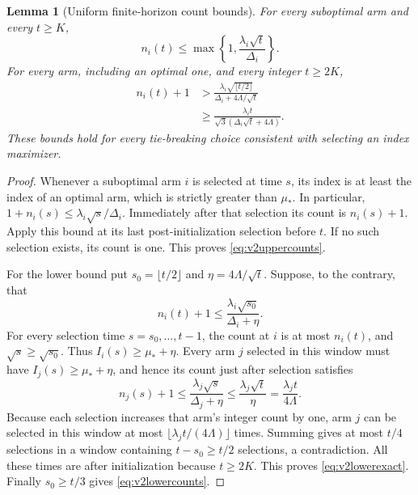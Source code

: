 \documentclass{article}
\theoremstyle{plain}
\newtheorem{lemma}[theorem]{Lemma}
\theoremstyle{definition}
\begin{document}
\begin{lemma}[Uniform finite-horizon count bounds]
\label{lem:v2counts}
For every suboptimal arm and every $t\ge K$,
\begin{equation}
 n_i(t)\le\max\!\left\{1,\frac{\lambda_i\sqrt t}{\Delta_i}\right\}.
 \label{eq:v2uppercounts}
\end{equation}
For every arm, including an optimal one, and every integer $t\ge2K$,
\begin{align}
 n_i(t)+1
 &>\frac{\lambda_i\sqrt{\lfloor t/2\rfloor}}
          {\Delta_i+4\Lambda/\sqrt t}
 \label{eq:v2lowerexact}\\
 &\ge\frac{\lambda_i t}
             {\sqrt3(\Delta_i\sqrt t+4\Lambda)}.
 \label{eq:v2lowercounts}
\end{align}
These bounds hold for every tie-breaking choice consistent with selecting
an index maximizer.
\end{lemma}
\begin{proof}
Whenever a suboptimal arm $i$ is selected at time $s$, its index is at
least the index of an optimal arm, which is strictly greater than
$\mu_*$. In particular,
$1+n_i(s)\le\lambda_i\sqrt s/\Delta_i$.
Immediately after that selection its count is $n_i(s)+1$. Apply this
bound at its last post-initialization selection before $t$. If no such
selection exists, its count is one. This proves
\eqref{eq:v2uppercounts}.

For the lower bound put $s_0=\lfloor t/2\rfloor$ and
$\eta=4\Lambda/\sqrt t$. Suppose, to the contrary, that
\[
 n_i(t)+1\le\frac{\lambda_i\sqrt{s_0}}{\Delta_i+\eta}.
\]
For every selection time $s=s_0,\ldots,t-1$, the count at $i$ is at most
$n_i(t)$, and $\sqrt s\ge\sqrt{s_0}$. Thus
$I_i(s)\ge\mu_*+\eta$. Every arm $j$ selected in this window must have
$I_j(s)\ge\mu_*+\eta$, and hence its count just after selection satisfies
\[
 n_j(s)+1\le\frac{\lambda_j\sqrt s}{\Delta_j+\eta}
 \le\frac{\lambda_j\sqrt t}{\eta}
 =\frac{\lambda_j t}{4\Lambda}.
\]
Because each selection increases that arm's integer count by one, arm
$j$ can be selected in this window at most
$\lfloor\lambda_j t/(4\Lambda)\rfloor$ times. Summing gives at most
$t/4$ selections in a window containing
$t-s_0\ge t/2$ selections, a contradiction. All these times are after
initialization because $t\ge2K$. This proves
\eqref{eq:v2lowerexact}. Finally $s_0\ge t/3$ gives
\eqref{eq:v2lowercounts}.
\end{proof}
\end{document}
